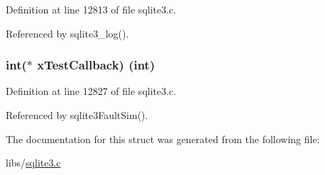 Definition at line 12813 of file sqlite3.\+c.



Referenced by sqlite3\+\_\+log().

\hypertarget{struct_sqlite3_config_ad7abf49f736329ee72d954343b39a706}{}
\subsubsection[{x\+Test\+Callback}]{\setlength{\rightskip}{0pt plus 5cm}int($\ast$ x\+Test\+Callback) (int)}\label{struct_sqlite3_config_ad7abf49f736329ee72d954343b39a706}


Definition at line 12827 of file sqlite3.\+c.



Referenced by sqlite3\+Fault\+Sim().



The documentation for this struct was generated from the following file\+:\begin{DoxyCompactItemize}
\item 
libs/\hyperlink{sqlite3_8c}{sqlite3.\+c}\end{DoxyCompactItemize}
